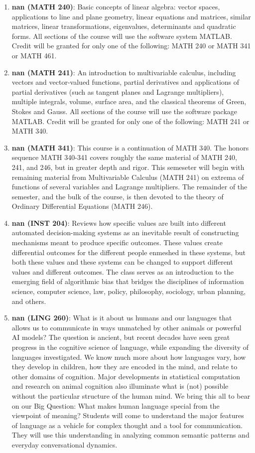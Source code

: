 \begin{enumerate}
\item \textbf{nan (MATH 240)}: Basic concepts of linear algebra: vector spaces, applications to line and plane geometry, linear equations and matrices, similar matrices, linear transformations, eigenvalues, determinants and quadratic forms. All sections of the course will use the software system MATLAB. Credit will be granted for only one of the following: MATH 240 or MATH 341 or MATH 461.
\item \textbf{nan (MATH 241)}: An introduction to multivariable calculus, including vectors and vector-valued functions, partial derivatives and applications of partial derivatives (such as tangent planes and Lagrange multipliers), multiple integrals, volume, surface area, and the classical theorems of Green, Stokes and Gauss. All sections of the course will use the software package MATLAB. Credit will be granted for only one of the following: MATH 241 or MATH 340.
\item \textbf{nan (MATH 341)}: This course is a continuation of MATH 340. The honors sequence MATH 340-341 covers roughly the same material of MATH 240, 241, and 246, but in greater depth and rigor. This semeseter will begin with remaining material from Multivariable Calculus (MATH 241) on extrema of functions of several variables and Lagrange multipliers. The remainder of the semester, and the bulk of the course, is then devoted to the theory of Ordinary Differential Equations (MATH 246).
\item \textbf{nan (INST 204)}: Reviews how specific values are built into different automated decision-making systems as an inevitable result of constructing mechanisms meant to produce specific outcomes. These values create differential outcomes for the different people enmeshed in these systems, but both these values and these systems can be changed to support different values and different outcomes. The class serves as an introduction to the emerging field of algorithmic bias that bridges the disciplines of information science, computer science, law, policy, philosophy, sociology, urban planning, and others.
\item \textbf{nan (LING 260)}: What is it about us humans and our languages that allows us to communicate in ways unmatched by other animals or powerful AI models? The question is ancient, but recent decades have seen great progress in the cognitive science of language, while expanding the diversity of languages investigated. We know much more about how languages vary, how they develop in children, how they are encoded in the mind, and relate to other domains of cognition. Major developments in statistical computation and research on animal cognition also illuminate what is (not) possible without the particular structure of the human mind. We bring this all to bear on our Big Question: What makes human language special from the viewpoint of meaning? Students will come to understand the major features of language as a vehicle for complex thought and a tool for communication. They will use this understanding in analyzing common semantic patterns and everyday conversational dynamics.

\end{enumerate}
